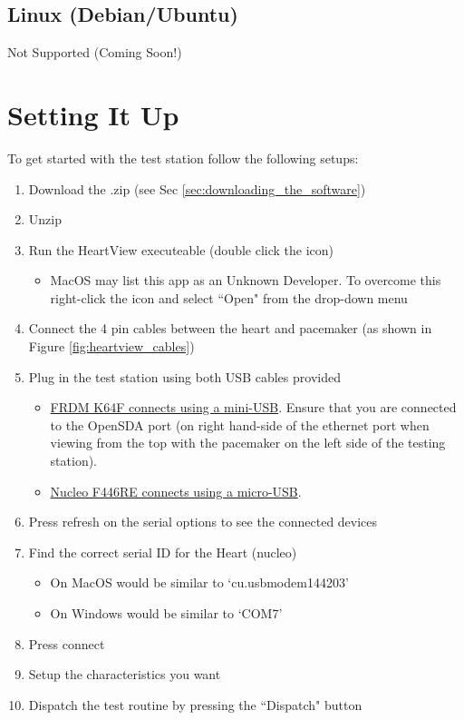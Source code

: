 \documentclass[11pt,fleqn]{book} %
\begin{document}
\subsection{Linux (Debian/Ubuntu)}

Not Supported (Coming Soon!)


\section{Setting It Up}

To get started with the test station follow the following setups:

\begin{enumerate}
	\item Download the .zip (see Sec \ref{sec:downloading_the_software})
	\item Unzip
	\item Run the HeartView executeable (double click the icon)
		\begin{itemize}
			\item MacOS may list this app as an Unknown Developer. To overcome this right-click the icon and select ``Open" from the drop-down menu
		\end{itemize}
	\item Connect the 4 pin cables between the heart and pacemaker (as shown in Figure \ref{fig:heartview_cables})
	\item Plug in the test station using both USB cables provided
		\begin{itemize}
			\item \underline{FRDM K64F connects using a mini-USB}. Ensure that you are connected to the OpenSDA port (on right hand-side of the ethernet port when viewing from the top with the pacemaker on the left side of the testing station).
			\item \underline{Nucleo F446RE connects using a micro-USB}.
		\end{itemize}
	\item Press refresh on the serial options to see the connected devices
	\item Find the correct serial ID for the Heart (nucleo)
		\begin{itemize}
			\item On MacOS would be similar to `cu.usbmodem144203'
			\item On Windows would be similar to `COM7'
		\end{itemize}
	\item Press connect
	\item Setup the characteristics you want
	\item Dispatch the test routine by pressing the ``Dispatch" button
\end{enumerate}
\end{document}
